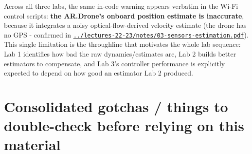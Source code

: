 \documentclass[11pt]{article}
\begin{document}
Across all three labs, the same in-code warning appears verbatim in the Wi-Fi control scripts: \textbf{the AR.Drone's onboard position estimate is inaccurate}, because it integrates a noisy optical-flow-derived velocity estimate (the drone has no GPS - confirmed in \href{../lectures-22-23/notes/03-sensors-estimation.pdf}{\texttt{../lectures-22-23/notes/03-\allowbreak{}sensors-\allowbreak{}estimation.pdf}}). This single limitation is the throughline that motivates the whole lab sequence: Lab 1 identifies how bad the raw dynamics/estimates are, Lab 2 builds better estimators to compensate, and Lab 3's controller performance is explicitly expected to depend on how good an estimator Lab 2 produced.

\section{Consolidated gotchas / things to double-check before relying on this material}
\end{document}
